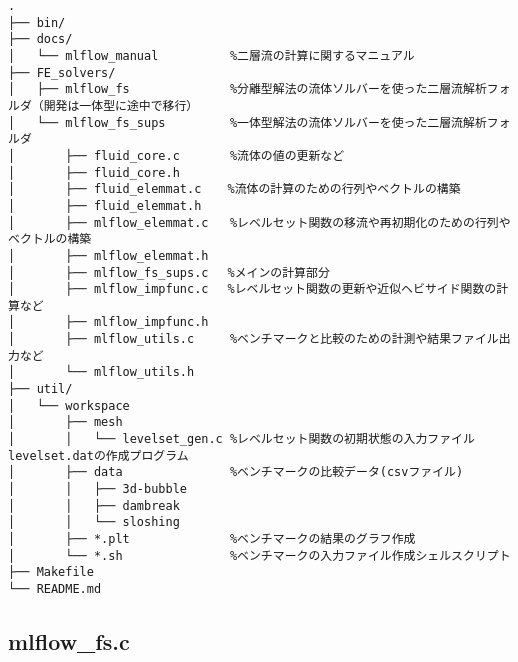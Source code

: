 \begin{verbatim}
.
├── bin/
├── docs/
│   └── mlflow_manual          %二層流の計算に関するマニュアル
├── FE_solvers/
│   ├── mlflow_fs              %分離型解法の流体ソルバーを使った二層流解析フォルダ（開発は一体型に途中で移行）
│   └── mlflow_fs_sups         %一体型解法の流体ソルバーを使った二層流解析フォルダ
│   	├── fluid_core.c       %流体の値の更新など
│   	├── fluid_core.h
│   	├── fluid_elemmat.c　  %流体の計算のための行列やベクトルの構築
│   	├── fluid_elemmat.h
│   	├── mlflow_elemmat.c   %レベルセット関数の移流や再初期化のための行列やベクトルの構築
│   	├── mlflow_elemmat.h
│   	├── mlflow_fs_sups.c　 %メインの計算部分
│   	├── mlflow_impfunc.c　 %レベルセット関数の更新や近似ヘビサイド関数の計算など
│   	├── mlflow_impfunc.h
│   	├── mlflow_utils.c     %ベンチマークと比較のための計測や結果ファイル出力など
│   	└── mlflow_utils.h
├── util/
│   └── workspace
│   	├── mesh
│   	│   └── levelset_gen.c %レベルセット関数の初期状態の入力ファイルlevelset.datの作成プログラム
│   	├── data               %ベンチマークの比較データ(csvファイル)
│   	│   ├── 3d-bubble
│   	│   ├── dambreak
│   	│   └── sloshing
│   	├── *.plt              %ベンチマークの結果のグラフ作成
│   	└── *.sh               %ベンチマークの入力ファイル作成シェルスクリプト
├── Makefile
└── README.md
\end{verbatim}

\subsection{mlflow\_fs.c}
